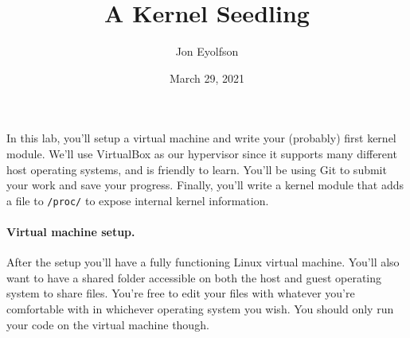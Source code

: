 

\title{A Kernel Seedling}
\author{Jon Eyolfson}
\date{March 29, 2021}



\maketitle

In this lab, you'll setup a virtual machine and write your (probably) first
kernel module.
We'll use VirtualBox as our hypervisor since it supports many different host
operating systems, and is friendly to learn.
You'll be using Git to submit your work and save your progress.
Finally, you'll write a kernel module that adds a file to \lstinline|/proc/|
to expose internal kernel information.

\paragraph{Virtual machine setup.}

After the setup you'll have a fully functioning Linux virtual machine.
You'll also want to have a shared folder accessible on both the host and guest
operating system to share files.
You're free to edit your files with whatever you're comfortable with in
whichever operating system you wish.
You should only run your code on the virtual machine though.


